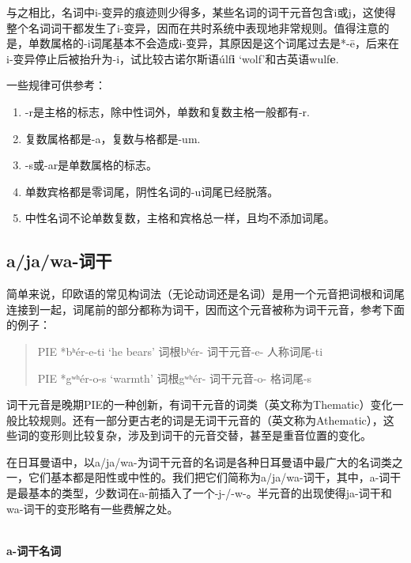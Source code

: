 与之相比，名词中i-变异的痕迹则少得多，某些名词的词干元音包含i或j，这使得整个名词词干都发生了i-变异，因而在共时系统中表现地非常规则。值得注意的是，单数属格的-i词尾基本不会造成i-变异，其原因是这个词尾过去是*-ē，后来在i-变异停止后被抬升为-i，试比较古诺尔斯语úlf\textbf{i}
`wolf'和古英语wulf\textbf{e}.

一些规律可供参考：

\begin{info}
    \begin{enumerate}[1.]
        \item -r是主格的标志，除中性词外，单数和复数主格一般都有-r.
        \item 复数属格都是-a，复数与格都是-um.
        \item -s或-ar是单数属格的标志。
        \item 单数宾格都是零词尾，阴性名词的-u词尾已经脱落。
        \item 中性名词不论单数复数，主格和宾格总一样，且均不添加词尾。
      

    \end{enumerate}
\end{info}

\subsection{a/ja/wa-词干}
\label{a/ja/wa-词干}

简单来说，印欧语的常见构词法（无论动词还是名词）是用一个元音把词根和词尾连接到一起，词尾前的部分都称为词干，因而这个元音被称为词干元音，参考下面的例子：

\begin{quote}
  PIE *bʰér-e-ti `he bears' 词根bʰér- 词干元音-e- 人称词尾-ti

  PIE *gʷʰér-o-s `warmth' 词根gʷʰér- 词干元音-o- 格词尾-s
\end{quote}

词干元音是晚期PIE的一种创新，有词干元音的词类（英文称为Thematic）变化一般比较规则。还有一部分更古老的词是无词干元音的（英文称为Athematic），这些词的变形则比较复杂，涉及到词干的元音交替，甚至是重音位置的变化。

在日耳曼语中，以a/ja/wa-为词干元音的名词是各种日耳曼语中最广大的名词类之一，它们基本都是阳性或中性的。我们把它们简称为a/ja/wa-词干，其中，a-词干是最基本的类型，少数词在a-前插入了一个-j-/-w-。半元音的出现使得ja-词干和wa-词干的变形略有一些费解之处。

~\\
\textbf{a-词干名词}


